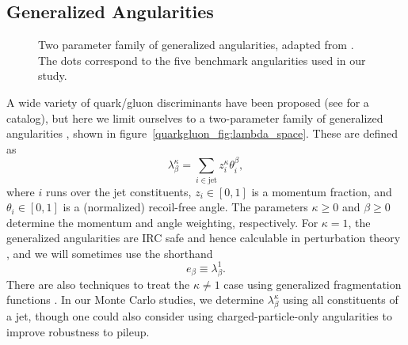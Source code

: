 \documentclass[11pt]{cernrep}
\begin{document}
\subsection{Generalized Angularities}
\label{quarkgluon_sec:genang}

\begin{figure}
\centering
{}
\caption{Two parameter family of generalized angularities, adapted from \cite{Larkoski:2014pca}.  The dots correspond to the five benchmark angularities used in our study.}
\label{fig:lambda_space}
\end{figure}

A wide variety of quark/gluon discriminants have been proposed (see \cite{} for a catalog), but here we limit ourselves to a two-parameter family of generalized angularities \cite{}, shown in figure~\ref{quarkgluon_fig:lambda_space}.  These are defined as
\begin{equation}
\label{eq:genang}
\lambda^{\kappa}_{\beta} = \sum_{i \in \text{jet}} z_i^\kappa \theta_i^\beta,
\end{equation}
where $i$ runs over the jet constituents, $z_i \in [0,1]$ is a momentum fraction, and $\theta_i \in [0,1]$ is a (normalized) recoil-free angle. The parameters $\kappa \ge 0$ and $\beta \ge 0$ determine the momentum and angle weighting, respectively.  For $\kappa = 1$, the generalized angularities are IRC safe and hence calculable in perturbation theory \cite{}, and we will sometimes use the shorthand
\begin{equation}
e_\beta \equiv \lambda^{1}_{\beta}. 
\end{equation}
There are also techniques to treat the $\kappa \not= 1$ case using generalized fragmentation functions \cite{Larkoski:2014pca}.  In our Monte Carlo studies, we determine $\lambda^{\kappa}_{\beta}$ using all constituents of a jet, though one could also consider using charged-particle-only angularities to improve robustness to pileup.
\end{document}
